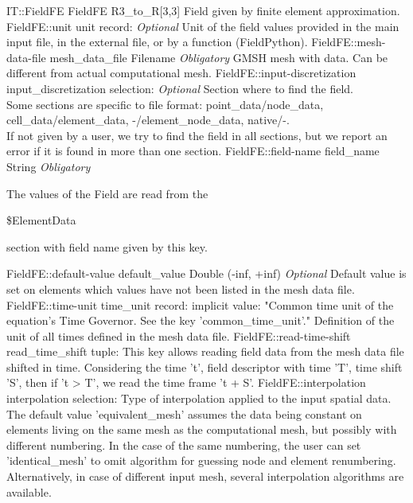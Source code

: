 \begin{RecordType}
	{IT::FieldFE}
	{FieldFE}
	{}%
	{}%
	{{{R3{\_}to{\_}R[3,3] Field given by finite element approximation.}%
}}
		\RecKey
			{FieldFE::unit}
			{unit}
			{{record: }}{}
			{ \it{Optional}}
			{{{Unit of the field values provided in the main input file, in the external file, or by a function (FieldPython).}%
}}
		\RecKey
			{FieldFE::mesh-data-file}
			{mesh{\_}data{\_}file}
			{{Filename}}{}
			{ \it{Obligatory}}
			{{{GMSH mesh with data.
Can be different from actual computational mesh.}%
}}
		\RecKey
			{FieldFE::input-discretization}
			{input{\_}discretization}
			{{selection: }}{}
			{ \it{Optional}}
			{{{Section where to find the field.}\\{
 Some sections are specific to file format: point{\_}data/node{\_}data, cell{\_}data/element{\_}data, -/element{\_}node{\_}data, native/-.}\\{
If not given by a user, we try to find the field in all sections, but we report an error if it is found in more than one section.}%
}}
		\RecKey
			{FieldFE::field-name}
			{field{\_}name}
			{{String}}{}
			{ \it{Obligatory}}
			{{{The values of the Field are read from the }\begin{ttfamily}{\$}ElementData\end{ttfamily}{ section with field name given by this key.}%
}}
		\RecKey
			{FieldFE::default-value}
			{default{\_}value}
			{{Double (-inf, +inf)}}{}
			{ \it{Optional}}
			{{{Default value is set on elements which values have not been listed in the mesh data file.}%
}}
		\RecKey
			{FieldFE::time-unit}
			{time{\_}unit}
			{{record: }}{}
			{implicit value: "{Common time unit of the equation's Time Governor.
See the key 'common{\_}time{\_}unit'.}"}
			{{{Definition of the unit of all times defined in the mesh data file.}%
}}
		\RecKey
			{FieldFE::read-time-shift}
			{read{\_}time{\_}shift}
			{{tuple: }}{}
			{ }
			{{{This key allows reading field data from the mesh data file shifted in time.
Considering the time 't', field descriptor with time 'T', time shift 'S', then if 't {\textgreater} T', we read the time frame 't + S'.}%
}}
		\RecKey
			{FieldFE::interpolation}
			{interpolation}
			{{selection: }}{}
			{ }
			{{{Type of interpolation applied to the input spatial data.}\\{
The default value 'equivalent{\_}mesh' assumes the data being constant on elements living on the same mesh as the computational mesh, but possibly with different numbering.
In the case of the same numbering, the user can set 'identical{\_}mesh' to omit algorithm for guessing node and element renumbering.
Alternatively, in case of different input mesh, several interpolation algorithms are available.}%
}}
\end{RecordType}
